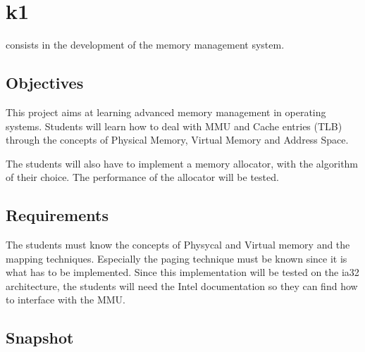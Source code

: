 %
%
%
%
%
%

%
%

\chapter{k1}
\label{chapter:k1}

 consists in the development of the memory management system.

\newpage

%
%

%
%

\section{Objectives}

This project aims at learning advanced memory management in operating systems. Students will learn how to deal with MMU and Cache entries (TLB) through the concepts of Physical Memory, Virtual Memory and Address Space.

The students will also have to implement a memory allocator, with the algorithm of their choice. The performance of the allocator will be tested.

%
%

\section{Requirements}

The students must know the concepts of Physycal and Virtual memory and the mapping techniques. Especially the paging technique must be known since it is what has to be implemented. Since this implementation will be tested on the ia32 architecture, the students will need the Intel documentation so they can find how to interface with the MMU.

%
%

\section{Snapshot}

